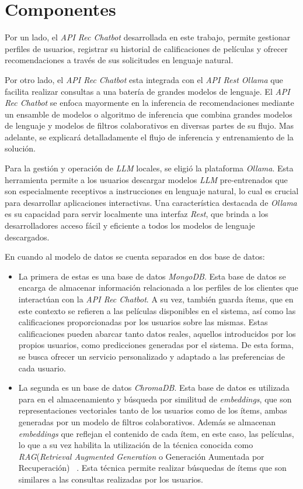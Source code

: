 \documentclass[11pt,a4paper,twoside]{thesis}
\begin{document}
\vfill
\section{Componentes}

Por un lado, el \textit{API Rec Chatbot} desarrollada en este trabajo, permite gestionar perfiles de usuarios, registrar su historial de calificaciones de películas y ofrecer recomendaciones a través de sus solicitudes en lenguaje natural.

Por otro lado, el \textit{API Rec Chatbot} esta integrada con el \textit{API Rest Ollama} que facilita realizar consultas a una batería de grandes modelos de lenguaje. El \textit{API Rec Chatbot} se enfoca mayormente en la inferencia de recomendaciones mediante un ensamble de modelos o algoritmo de inferencia que combina grandes modelos de lenguaje y modelos de filtros colaborativos en diversas partes de su flujo. Mas adelante, se explicará detalladamente el flujo de inferencia y entrenamiento de la solución.

Para la gestión y operación de \textit{LLM} locales, se eligió la plataforma \textit{Ollama}. Esta herramienta permite a los usuarios descargar modelos \textit{LLM} pre-entrenados que son especialmente receptivos a instrucciones en lenguaje natural, lo cual es crucial para desarrollar aplicaciones interactivas. Una característica destacada de \textit{Ollama} es su capacidad para servir localmente una interfaz \textit{Rest}, que brinda a los desarrolladores acceso fácil y eficiente a todos los modelos de lenguaje descargados.

En cuando al modelo de datos se cuenta separados en dos base de datos:
\begin{itemize}
	\item La primera de estas es una base de datos \textit{MongoDB}. Esta base de datos se encarga de almacenar información relacionada a los perfiles de los clientes que interactúan con la \textit{API Rec Chatbot}. A su vez, también guarda ítems, que en este contexto se refieren a las películas disponibles en el sistema, así como las calificaciones proporcionadas por los usuarios sobre las mismas. Estas calificaciones pueden abarcar tanto datos reales, aquellos introducidos por los propios usuarios, como predicciones generadas por el sistema. De esta forma, se busca ofrecer un servicio personalizado y adaptado a las preferencias de cada usuario.

	\item La segunda es un base de datos \textit{ChromaDB}. Esta base de datos es utilizada para en el almacenamiento y búsqueda por similitud de \textit{embeddings}, que son representaciones vectoriales tanto de los usuarios como de los ítems, ambas generadas por un modelo de filtros colaborativos. Además se almacenan \textit{embeddings} que reflejan el contenido de cada ítem, en este caso, las películas, lo que a su vez habilita la utilización de la técnica conocida como \textit{RAG}(\textit{Retrieval Augmented Generation} o Generación Aumentada por Recuperación) ~\cite{rag}. Esta técnica permite realizar búsquedas de ítems que son similares a las consultas realizadas por los usuarios.
\end{itemize}
\end{document}
